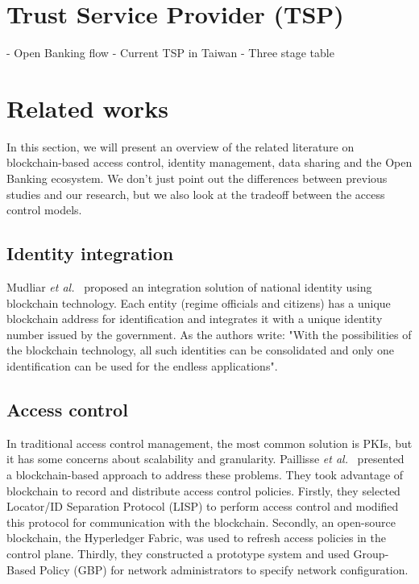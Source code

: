 \newpage

\section{Trust Service Provider (TSP)}
- Open Banking flow
- Current TSP in Taiwan
- Three stage table

\newpage

\section{Related works}
In this section, we will present an overview of the related literature on blockchain-based access control, identity management, data sharing and the Open Banking ecosystem. We don't just point out the differences between previous studies and our research, but we also look at the tradeoff between the access control models.
\subsection{Identity integration}
Mudliar \emph{et al.}~\cite{mudliar2018comprehensive} proposed an integration solution of national identity using blockchain technology. Each entity (regime officials and citizens) has a unique blockchain address for identification and integrates it with a unique identity number issued by the government. As the authors write: "With the possibilities of the blockchain technology, all such identities can be consolidated and only one identification can be used for the endless applications".

\subsection{Access control}
In traditional access control management, the most common solution is PKIs, but it has some concerns about scalability and granularity. Paillisse \emph{et al.}~\cite{paillisse2019distributed} presented a blockchain-based approach to address these problems. They took advantage of blockchain to record and distribute access control policies. Firstly, they selected Locator/ID Separation Protocol (LISP) to perform access control and modified this protocol for communication with the blockchain. Secondly, an open-source blockchain, the Hyperledger Fabric, was used to refresh access policies in the control plane. Thirdly, they constructed a prototype system and used Group-Based Policy (GBP) for network administrators to specify network configuration.\par

